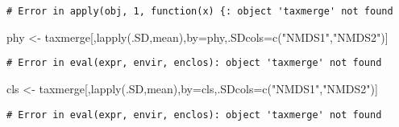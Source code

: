 \documentclass[
]{article}
\newenvironment{Shaded}{\begin{snugshade}}{\end{snugshade}}
\newcommand{\AttributeTok}[1]{\textcolor[rgb]{0.77,0.63,0.00}{#1}}
\newcommand{\DecValTok}[1]{\textcolor[rgb]{0.00,0.00,0.81}{#1}}
\newcommand{\FloatTok}[1]{\textcolor[rgb]{0.00,0.00,0.81}{#1}}
\newcommand{\FunctionTok}[1]{\textcolor[rgb]{0.00,0.00,0.00}{#1}}
\newcommand{\NormalTok}[1]{#1}
\newcommand{\OtherTok}[1]{\textcolor[rgb]{0.56,0.35,0.01}{#1}}
\newcommand{\SpecialCharTok}[1]{\textcolor[rgb]{0.00,0.00,0.00}{#1}}
\newcommand{\StringTok}[1]{\textcolor[rgb]{0.31,0.60,0.02}{#1}}
\begin{document}
\begin{Shaded}
\end{Shaded}

\begin{verbatim}
# Error in apply(obj, 1, function(x) {: object 'taxmerge' not found
\end{verbatim}

\begin{Shaded}
\begin{Highlighting}[]
\NormalTok{phy }\OtherTok{\textless{}{-}}\NormalTok{ taxmerge[,}\FunctionTok{lapply}\NormalTok{(.SD,mean),by}\OtherTok{=}\NormalTok{phy,.SDcols}\OtherTok{=}\FunctionTok{c}\NormalTok{(}\StringTok{"NMDS1"}\NormalTok{,}\StringTok{"NMDS2"}\NormalTok{)]}
\end{Highlighting}
\end{Shaded}

\begin{verbatim}
# Error in eval(expr, envir, enclos): object 'taxmerge' not found
\end{verbatim}

\begin{Shaded}
\begin{Highlighting}[]
\NormalTok{cls }\OtherTok{\textless{}{-}}\NormalTok{ taxmerge[,}\FunctionTok{lapply}\NormalTok{(.SD,mean),by}\OtherTok{=}\NormalTok{cls,.SDcols}\OtherTok{=}\FunctionTok{c}\NormalTok{(}\StringTok{"NMDS1"}\NormalTok{,}\StringTok{"NMDS2"}\NormalTok{)]}
\end{Highlighting}
\end{Shaded}

\begin{verbatim}
# Error in eval(expr, envir, enclos): object 'taxmerge' not found
\end{verbatim}
\end{document}
